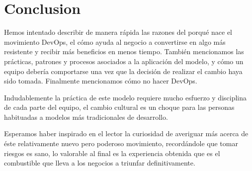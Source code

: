\documentclass[conference]{IEEEtran}
\begin{document}
%





\section{Conclusion}
Hemos intentado describir de manera rápida las razones del porqué nace el movimiento DevOps, el cómo ayuda al negocio a convertirse en algo más resistente y recibir más beneficios en menos tiempo. También mencionamos las prácticas, patrones y procesos asociados a la aplicación del modelo, y cómo un equipo debería comportarse una vez que la decisión de realizar el cambio haya sido tomada. Finalmente mencionamos cómo no hacer DevOps.

Indudablemente la práctica de este modelo requiere mucho esfuerzo y disciplina de cada parte del equipo, el cambio cultural es un choque para las personas habituadas a modelos más tradicionales de desarrollo. 

Esperamos haber inspirado en el lector la curiosidad de averiguar más acerca de éste relativamente nuevo pero poderoso movimiento, recordándole que tomar riesgos es sano, lo valorable al final es la experiencia obtenida que es el combustible que lleva a los negocios a triunfar definitivamente.
\end{document}
